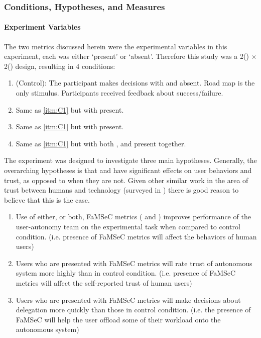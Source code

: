     \subsubsection{Conditions, Hypotheses, and Measures} \label{sec:hyp_cond_meas}
    \paragraph{Experiment Variables}
    The two \famsec{} metrics discussed herein were the experimental variables in this experiment, each was either `present' or `absent'. Therefore this study was a 2(\xQ) $\times$ 2(\xO) design, resulting in 4 conditions:

    \begin{enumerate}[label=\textbf{C\arabic*}]
        \item (Control): The participant makes decisions with \xQ{} and \xO{} absent. Road map is the only stimulus. Participants received feedback about success/failure. \label{itm:C1}
        \item Same as \ref{itm:C1} but with \xQ{} present.\label{itm:C2}
        \item Same as \ref{itm:C1} but with \xO{} present. \label{itm:C3}
        \item Same as \ref{itm:C1} but with both \xQ{}, and \xO{} present together. \label{itm:C4}
    \end{enumerate}

    The experiment was designed to investigate three main hypotheses. Generally, the overarching hypotheses is that \xQ{} and \xO{} have significant effects on user behaviors and trust, as opposed to when they are not. Given other similar work in the area of trust between humans and technology (surveyed in \cite{Israelsen2019-to}) there is good reason to believe that this is the case.

    \begin{enumerate}[label=\textbf{H\arabic*}]
        \item Use of either, or both, FaMSeC metrics (\xQ{} and \xO{}) improves performance of the user-autonomy team on the experimental task when compared to control condition. (i.e. presence of FaMSeC metrics will affect the behaviors of human users) \label{itm:H1}
        \item Users who are presented with FaMSeC metrics will rate trust of autonomous system more highly than in control condition. (i.e. presence of FaMSeC metrics will affect the self-reported trust of human users) \label{itm:H2}
        \item Users who are presented with FaMSeC metrics will make decisions about delegation more quickly than those in control condition. (i.e. the presence of FaMSeC will help the user offload some of their workload onto the autonomous system) \label{itm:H3}
    \end{enumerate}

